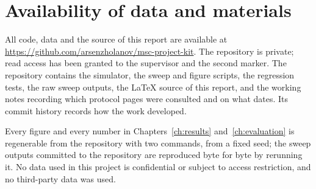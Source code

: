 \section*{Availability of data and materials}

All code, data and the source of this report are available at
\url{https://github.com/arsenzholanov/msc-project-kit}. The repository is private; read
access has been granted to the supervisor and the second marker. The
repository contains the simulator, the sweep and figure scripts, the regression tests, the
raw sweep outputs, the LaTeX source of this report, and the working notes recording which
protocol pages were consulted and on what dates. Its commit history records how the work
developed.

Every figure and every number in Chapters~\ref{ch:results} and~\ref{ch:evaluation} is
regenerable from the repository with two commands, from a fixed seed; the sweep outputs
committed to the repository are reproduced byte for byte by rerunning it. No data used in
this project is confidential or subject to access restriction, and no third-party data was
used.
